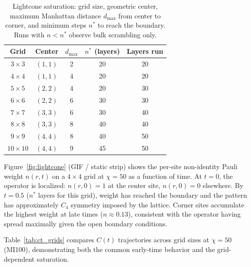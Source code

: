 \documentclass[11pt]{article}
\newcommand{\Ct}{C(t)}
\begin{document}
\begin{table}[ht]
\centering
\caption{Lightcone saturation: grid size, geometric center, maximum Manhattan
  distance $d_{\mathrm{max}}$ from center to corner, and minimum steps $n^*$
  to reach the boundary.
  Runs with $n < n^*$ observe bulk scrambling only.}
\label{tab:lightcone}
\begin{tabular}{ccccc}
\toprule
Grid & Center & $d_{\mathrm{max}}$ & $n^*$ (layers) & Layers run \\
\midrule
$3\times3$   & $(1,1)$ & 2 & 20 & 20 \\
$4\times4$   & $(1,1)$ & 4 & 20 & 20 \\
$5\times5$   & $(2,2)$ & 4 & 20 & 30 \\
$6\times6$   & $(2,2)$ & 6 & 30 & 30 \\
$7\times7$   & $(3,3)$ & 6 & 30 & 40 \\
$8\times8$   & $(3,3)$ & 8 & 40 & 40 \\
$9\times9$   & $(4,4)$ & 8 & 40 & 50 \\
$10\times10$ & $(4,4)$ & 9 & 45 & 50 \\
\bottomrule
\end{tabular}
\end{table}

Figure~\ref{fig:lightcone} (GIF / static strip) shows the per-site non-identity
Pauli weight $n(r,t)$ on a $4\times4$ grid at $\chi=50$ as a function of time.
At $t=0$, the operator is localized: $n(r,0) = 1$ at the center site,
$n(r,0) = 0$ elsewhere.
By $t = 0.5$ ($n^*$ layers for this grid), weight has reached the boundary
and the pattern has approximately $C_4$ symmetry imposed by the lattice.
Corner sites accumulate the highest weight at late times ($n \approx 0.13$),
consistent with the operator having spread maximally given the open boundary conditions.

Table~\ref{tab:ct_grids} compares $\Ct$ trajectories across grid sizes at
$\chi=50$ (MI100), demonstrating both the common early-time behavior and
the grid-dependent saturation.
\end{document}
